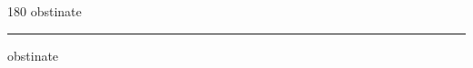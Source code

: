 
\begin{frame}
\begin{center}
\begin{turn}{180}
{\fontsize{2.5cm}{1em}\selectfont obstinate}
\end{turn}
\vspace{1em}\par  
\hrule
\vspace{1em}\par  
{\fontsize{2.5cm}{1em}\selectfont obstinate}
\end{center}
\end{frame}
